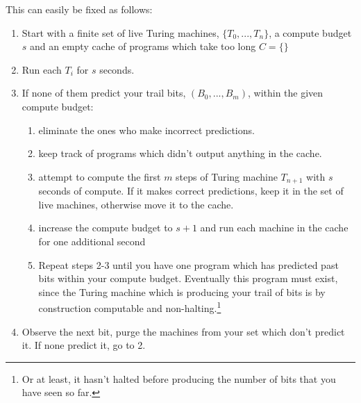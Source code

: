 \documentclass[12pt,authoryear]{elsarticle}
\begin{document}
This can easily be fixed as follows:

\begin{enumerate}
	\item Start with a finite set of live Turing machines, $\{T_0, ..., T_n\}$, a compute budget $s$ and an empty cache of programs which take too long $C =\{\}$
	\item Run each $T_i$ for $s$ seconds. 
	\item If none of them predict your trail bits, $(B_0, ..., B_m)$, within the given compute budget: 
		\begin{enumerate}
		   \item eliminate the ones who make incorrect predictions.
			 \item keep track of programs which didn't output anything in the cache.
			 \item attempt to compute the first $m$ steps of Turing machine $T_{n+1}$ with $s$ seconds of compute. If it makes correct predictions, keep it in the set of live machines, otherwise move it to the cache.
			 \item increase the compute budget to $s + 1$ and run each machine in the cache for one additional second
			 \item Repeat steps 2-3 until you have one program which has predicted past bits within your compute budget. Eventually this program must exist, since the Turing machine which is producing your trail of bits is by construction computable and non-halting.\footnote{Or at least, it hasn't halted before producing the number of bits that you have seen so far.}
		\end{enumerate}
	\item Observe the next bit, purge the machines from your set which don't predict it. If none predict it, go to 2.
\end{enumerate}
\end{document}

